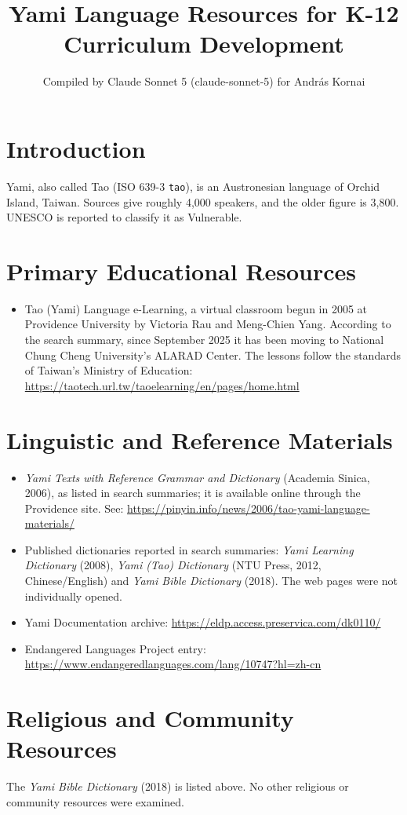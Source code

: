 \documentclass[12pt]{article}
\title{Yami Language Resources for K-12 Curriculum Development}
\author{Compiled by Claude Sonnet 5 (claude-sonnet-5) for Andr\'as Kornai}
\date{}
\begin{document}
\maketitle
\section{Introduction}
Yami, also called Tao (ISO 639-3 \texttt{tao}), is an Austronesian language of Orchid Island, Taiwan. Sources give roughly 4,000 speakers, and the older figure is 3,800. UNESCO is reported to classify it as Vulnerable.
\section{Primary Educational Resources}
\begin{itemize}
\item Tao (Yami) Language e-Learning, a virtual classroom begun in 2005 at Providence University by Victoria Rau and Meng-Chien Yang. According to the search summary, since September 2025 it has been moving to National Chung Cheng University's ALARAD Center. The lessons follow the standards of Taiwan's Ministry of Education: \url{https://taotech.url.tw/taoelearning/en/pages/home.html}
\end{itemize}
\section{Linguistic and Reference Materials}
\begin{itemize}
\item \emph{Yami Texts with Reference Grammar and Dictionary} (Academia Sinica, 2006), as listed in search summaries; it is available online through the Providence site. See: \url{https://pinyin.info/news/2006/tao-yami-language-materials/}
\item Published dictionaries reported in search summaries: \emph{Yami Learning Dictionary} (2008), \emph{Yami (Tao) Dictionary} (NTU Press, 2012, Chinese/English) and \emph{Yami Bible Dictionary} (2018). The web pages were not individually opened.
\item Yami Documentation archive: \url{https://eldp.access.preservica.com/dk0110/}
\item Endangered Languages Project entry: \url{https://www.endangeredlanguages.com/lang/10747?hl=zh-cn}
\end{itemize}
\section{Religious and Community Resources}
The \emph{Yami Bible Dictionary} (2018) is listed above. No other religious or community resources were examined.
\end{document}
